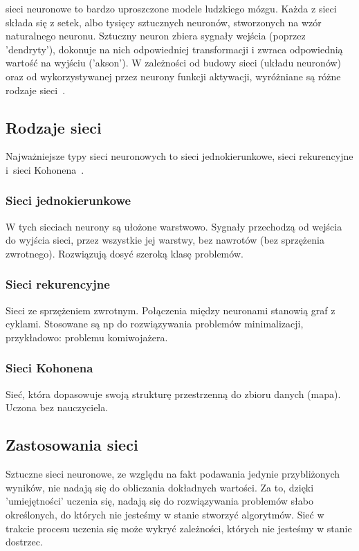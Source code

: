 \documentclass[journal]{IEEEtran}
\begin{document}
 sieci neuronowe to bardzo uproszczone modele ludzkiego mózgu.
Każda z sieci składa się z setek, albo tysięcy sztucznych neuronów, stworzonych na wzór naturalnego
neuronu. Sztuczny neuron zbiera sygnały wejścia (poprzez 'dendryty'), dokonuje na nich odpowiedniej
transformacji i zwraca odpowiednią wartość na wyjściu ('akson'). W zależności od budowy sieci (układu
neuronów) oraz od wykorzystywanej przez neurony funkcji aktywacji, wyróżniane są różne rodzaje sieci~\cite{tad:sieci}.

\subsection{Rodzaje sieci}
Najważniejsze typy sieci neuronowych to sieci jednokierunkowe, sieci rekurencyjne i~sieci Kohonena~\cite{wiki:sieci}.

\subsubsection{Sieci jednokierunkowe}
W tych sieciach neurony są ułożone warstwowo. Sygnały przechodzą od wejścia do wyjścia sieci, przez wszystkie jej
warstwy, bez nawrotów (bez sprzężenia zwrotnego). Rozwiązują dosyć szeroką klasę problemów.

\subsubsection{Sieci rekurencyjne}
Sieci ze sprzężeniem zwrotnym. Połączenia między neuronami stanowią graf z cyklami. Stosowane są np do rozwiązywania
problemów minimalizacji, przykładowo: problemu komiwojażera.

\subsubsection{Sieci Kohonena}
Sieć, która dopasowuje swoją strukturę przestrzenną do zbioru danych (mapa). Uczona bez nauczyciela.


\subsection{Zastosowania sieci}
Sztuczne sieci neuronowe, ze względu na fakt podawania jedynie przybliżonych wyników, nie nadają się do obliczania
dokładnych wartości. Za to, dzięki 'umiejętności' uczenia się, nadają się do rozwiązywania problemów słabo określonych,
do których nie jesteśmy w stanie stworzyć algorytmów. Sieć w trakcie procesu uczenia się może wykryć zależności,
których nie jesteśmy w stanie dostrzec.
\end{document}
